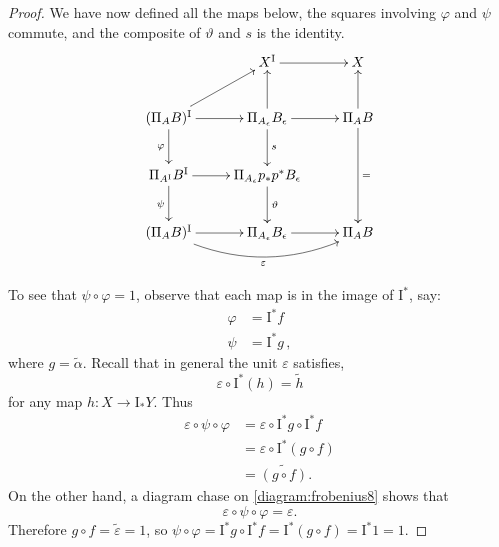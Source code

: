 \documentclass[12pt]{article}
\newcommand{\ra}{\ensuremath{\rightarrow}}
\newcommand{\I}{\ensuremath{\mathrm{I}}}
\theoremstyle{remark}
\theoremstyle{definition}
\begin{document}
\begin{proof}
We  have now defined all the maps below, the squares involving $\varphi$ and $\psi$ commute, and the  composite of $\vartheta$ and $s$  is the identity.
\begin{equation}\label{diagram:frobenius8}
\xymatrix{
& X^\I \ar[r] & X \\
 (\Pi_AB)^\I  \ar[r]  \ar[ru] \ar[d]_{\varphi} & \Pi_{A_\epsilon}B_\epsilon  \ar[u] \ar[d]^s \ar[r] & \Pi_{A}B \ar[u]\ar[dd]^= \\
 \Pi_{A^\I}B^\I \ar[r] \ar[d]_{\psi} & \Pi_{A_\epsilon} p_*p^* B_\epsilon \ar[d]^\vartheta & \\
  (\Pi_AB)^\I  \ar[r] \ar@/_4ex/ [rr]_\varepsilon & \Pi_{A_\epsilon}B_\epsilon \ar[r] & \Pi_{A}B 
}
\end{equation}

To see that $\psi\circ\varphi = 1$, observe that each map is in the image of $\I^*$, say:
\begin{align*}
\varphi &= \I^*f\\
\psi &= \I^*g\,,
\end{align*}
where  $g = \tilde{\alpha}$.
Recall that  in general the unit $\varepsilon$ satisfies, 
\[
\varepsilon\circ \I^*(h) = \tilde{h}
\]
for any map $h : X \ra \I_*Y$.  Thus
\begin{align*}
\varepsilon\circ\psi\circ\varphi &= \varepsilon\circ\I^*g\circ\I^*f\\
&= \varepsilon\circ\I^*(g\circ f)\\
&= \widetilde{(g\circ f)}.
\end{align*}
On the other hand, a diagram chase on \eqref{diagram:frobenius8} shows that 
\[
\varepsilon\circ\psi\circ\varphi = \varepsilon.
\]
Therefore $g\circ f = \tilde{\varepsilon} = 1$, so $\psi\circ\varphi = \I^*g\circ\I^*f = \I^*(g\circ f) = \I^*1 = 1$.


\end{proof}
\end{document}
